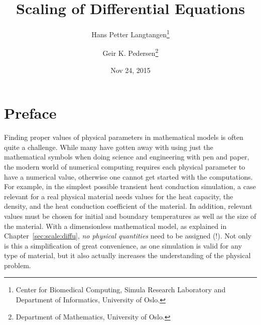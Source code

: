 \documentclass[graybox,envcountchap,sectrefs,final]{svmonodo}
\begin{document}







\frontmatter
\setcounter{page}{3}
\pagestyle{headings}



\title{Scaling of Differential Equations}


\author{Hans Petter Langtangen\footnote{Center for Biomedical Computing, Simula Research Laboratory and Department of Informatics, University of Oslo.}
\and Geir K. Pedersen\footnote{Department of Mathematics, University of Oslo.}}


\date{Nov 24, 2015}
\maketitle


\chapter*{Preface}
\label{ch:preface}

Finding proper values of physical parameters in mathematical models is
often quite a challenge. While many have gotten away with using just
the mathematical symbols when doing science and engineering with pen
and paper, the modern world of numerical computing requires each
physical parameter to have a numerical value, otherwise one cannot get
started with the computations.  For example, in the simplest possible
transient heat conduction simulation, a case relevant for a real
physical material needs values for the heat capacity, the density, and
the heat conduction coefficient of the material. In addition, relevant
values must be chosen for initial and boundary temperatures as well as
the size of the material.  With a dimensionless mathematical model, as
explained in Chapter~\ref{sec:scale:diffu}, \emph{no physical quantities}
need to be assigned (!). Not only is this a simplification of great
convenience, as one simulation is valid for any type of material, but
it also actually increases the understanding of the physical problem.
\end{document}

